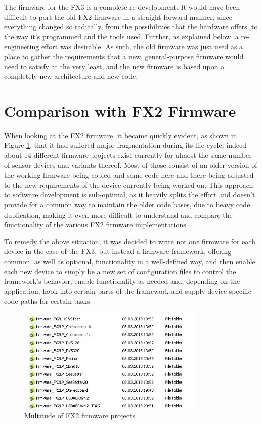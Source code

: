 \documentclass[a4paper,12pt]{report}
\begin{document}
The firmware for the FX3 is a complete re-development. It would have been difficult \cite{AN76348} to port the old FX2 firmware in a straight-forward manner, since everything changed so radically, from the possibilities that the hardware offers, to the way it's programmed and the tools used. Further, as explained below, a re-engineering effort was desirable. As such, the old firmware was just used as a place to gather the requirements that a new, general-purpose firmware would need to satisfy at the very least, and the new firmware is based upon a completely new architecture and new code.

\section{Comparison with FX2 Firmware} \label{sec:comparison_with_fx2_firmware}

When looking at the FX2 firmware, it became quickly evident, as shown in Figure \ref{fig:fx2_multiple}, that it had suffered major fragmentation during its life-cycle; indeed about 14 different firmware projects exist currently for almost the same number of sensor devices and variants thereof. Most of those consist of an older version of the working firmware being copied and some code here and there being adjusted to the new requirements of the device currently being worked on. This approach to software development is sub-optimal, as it heavily splits the effort and doesn't provide for a common way to maintain the older code bases, due to heavy code duplication, making it even more difficult to understand and compare the functionality of the various FX2 firmware implementations.

To remedy the above situation, it was decided to write not one firmware for each device in the case of the FX3, but instead a firmware framework, offering common, as well as optional, functionality in a well-defined way, and then enable each new device to simply be a new set of configuration files to control the framework's behavior, enable functionality as needed and, depending on the application, hook into certain parts of the framework and supply device-specific code-paths for certain tasks.

\begin{figure}[h]
\begin{center}
\includegraphics[width=0.8\textwidth]{fx2_multiple}
\caption{Multitude of FX2 firmware projects}
\label{fig:fx2_multiple}
\end{center}
\end{figure}
\end{document}
